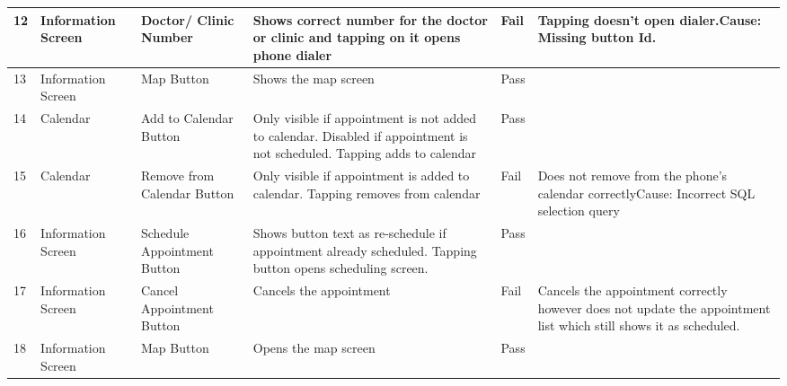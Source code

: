 \begin{table}[h]
{\begin{tabular}{|m{1cm}|m{3cm}|m{4cm}|m{6cm}|m{2cm}|m{6cm}|}
12      & Information Screen            & Doctor/ Clinic Number        & Shows correct number for the doctor or clinic and tapping on it opens phone dialer                                        & Fail        & Tapping doesn't open dialer.Cause: Missing button Id.                                                                                                    \\ \hline
13      & Information Screen            & Map Button                   & Shows the map screen                                                                                                      & Pass        &                                                                                                                                                            \\ \hline
14      & Calendar                      & Add to Calendar Button       & Only visible if appointment is not added to calendar. Disabled if appointment is not scheduled. Tapping adds to calendar  & Pass        &                                                                                                                                                            \\ \hline
15      & Calendar                      & Remove from Calendar Button  & Only visible if appointment is added to calendar. Tapping removes from calendar                                           & Fail        & Does not remove from the phone's calendar correctlyCause: Incorrect SQL selection query                                                                  \\ \hline
16      & Information Screen            & Schedule Appointment Button  & Shows button text as re-schedule if appointment already scheduled. Tapping button opens scheduling screen.                & Pass        &                                                                                                                                                            \\ \hline
17      & Information Screen            & Cancel Appointment Button    & Cancels the appointment                                                                                                   & Fail        & Cancels the appointment correctly however does not update the appointment list which still shows it as scheduled.                                          \\ \hline
18      & Information Screen            & Map Button                   & Opens the map screen                                                                                                      & Pass        &                                                                                                                                                            \\ \hline

\end{tabular}}
\end{table}
